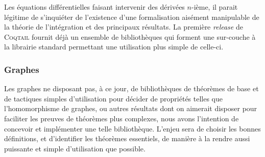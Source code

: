\documentclass[11pt]{article}
\newcommand{\coqtail}{\textsc{Coqtail}}
\begin{document}
Les équations différentielles faisant intervenir des dérivées $n$-ième, il parait légitime de s'inquiéter de l'existence d'une formalisation aisément manipulable de la théorie de l'intégration et des principaux résultats. La première \textit{release} de \coqtail{} fournit déjà un ensemble de bibliothèques qui forment une sur-couche à la librairie standard permettant une utilisation plus simple de celle-ci.

\subsubsection{Graphes}

Les graphes ne disposant pas, à ce jour, de bibliothèques de théorèmes de base et de tactiques simples d'utilisation pour décider de propriétés telles que l'homomorphisme de graphes, ou autres résultats dont on aimerait disposer pour faciliter les preuves de théorèmes plus complexes, nous avons l'intention de concevoir et implémenter une telle bibliothèque. L'enjeu sera de choisir les bonnes définitions, et d'identifier les théorèmes essentiels, de manière à la rendre aussi puissante et simple d'utilisation que possible.
\end{document}
